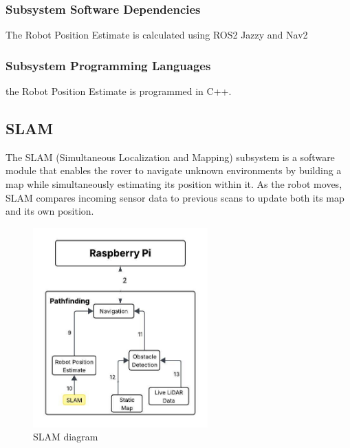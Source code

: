 \subsubsection{Subsystem Software Dependencies}
The Robot Position Estimate is calculated using ROS2 Jazzy and Nav2

\subsubsection{Subsystem Programming Languages}
the Robot Position Estimate is programmed in C++.

\newpage
\subsection{SLAM}
The SLAM (Simultaneous Localization and Mapping) subsystem is a software module that enables the rover to navigate unknown environments by building a map while simultaneously estimating its position within it. As the robot moves, SLAM compares incoming sensor data to previous scans to update both its map and its own position. 

\begin{figure}[h!]
	\centering
 	\includegraphics[width=0.60\textwidth]{images/pathfinding2nd/Data_Flow_SLAM.jpeg}
 \caption{SLAM diagram}
\end{figure}

